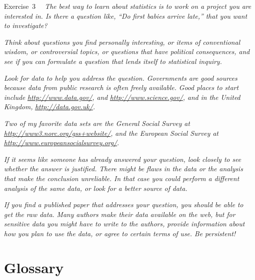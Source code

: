 \documentclass[]{book}
\begin{document}
Exercise~3~~ \emph{The best way to learn
about statistics is to work on a project you are interested in. Is there
a question like, ``Do first babies arrive late,'' that you want to
investigate?}

\emph{Think about questions you find
personally interesting, or items of conventional wisdom, or
controversial topics, or questions that have political consequences, and
see if you can formulate a question that lends itself to statistical
inquiry.}

\emph{Look for data to help you address the
question. Governments are good sources because data from public research
is often freely available. Good places to start include} \href{http://www.data.gov/}{\emph{http://www.data.gov/}}\emph{, and} \href{http://www.science.gov/}{\emph{http://www.science.gov/}}\emph{, and in the United Kingdom,} \href{http://data.gov.uk/}{\emph{http://data.gov.uk/}}\emph{.}

\emph{Two of my favorite data sets are the
General Social Survey at} \href{http://www3.norc.org/gss+website/}{\emph{http://www3.norc.org/gss+website/}}\emph{, and the European Social Survey at}
\href{http://www.europeansocialsurvey.org/}{\emph{http://www.europeansocialsurvey.org/}}\emph{.}

\emph{If it seems like someone has already
answered your question, look closely to see whether the answer is
justified. There might be flaws in the data or the analysis that make
the conclusion unreliable. In that case you could perform a different
analysis of the same data, or look for a better source of data.}

\emph{If you find a published paper that
addresses your question, you should be able to get the raw data. Many
authors make their data available on the web, but for sensitive data you
might have to write to the authors, provide information about how you
plan to use the data, or agree to certain terms of use. Be
persistent!}

\hypertarget{glossary}{%
\section{Glossary}\label{glossary}}
\end{document}
